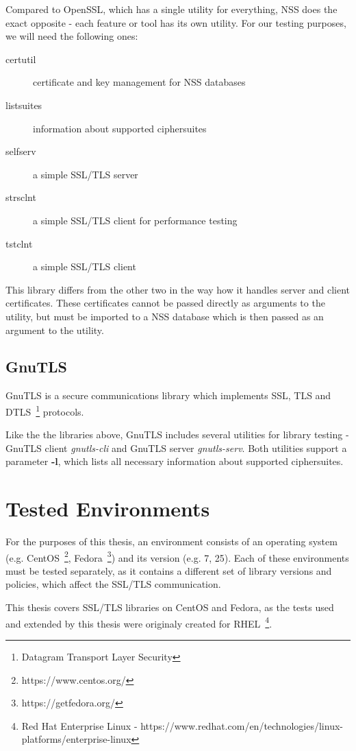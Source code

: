     Compared to OpenSSL, which has a single utility for everything, NSS does
    the exact opposite - each feature or tool has its own utility. For our
    testing purposes, we will need the following ones:
    \begin{description}
        \item [certutil] certificate and key management for NSS databases
        \item [listsuites] information about supported ciphersuites
        \item [selfserv] a simple SSL/TLS server
        \item [strsclnt] a simple SSL/TLS client for performance testing
        \item [tstclnt] a simple SSL/TLS client
    \end{description}

    This library differs from the other two in the way how it handles
    server and client certificates. These certificates cannot be passed
    directly as arguments to the utility, but must be imported to a NSS
    database which is then passed as an argument to the utility.

\subsection{GnuTLS}
    GnuTLS is a secure communications library which implements SSL, TLS and
    DTLS~\footnote{Datagram Transport Layer Security} protocols.

    Like the the libraries above, GnuTLS includes several utilities for library
    testing - GnuTLS client \textit{gnutls-cli} and GnuTLS server
    \textit{gnutls-serv}. Both utilities support a parameter \textbf{-l},
    which lists all necessary information about supported ciphersuites.

\section{Tested Environments}
    For the purposes of this thesis, an environment consists of an operating
    system (e.g.
    CentOS~\footnote{https://www.centos.org/},
    Fedora~\footnote{https://getfedora.org/}) and its version
    (e.g. 7, 25). Each of these environments must be tested separately, as
    it contains a different set of library versions and policies, which
    affect the SSL/TLS communication.

    This thesis covers SSL/TLS libraries on CentOS and Fedora, as the tests used
    and extended by this thesis were originaly created for
    RHEL~\footnote{Red Hat Enterprise Linux -
    https://www.redhat.com/en/technologies/linux-platforms/enterprise-linux}.

